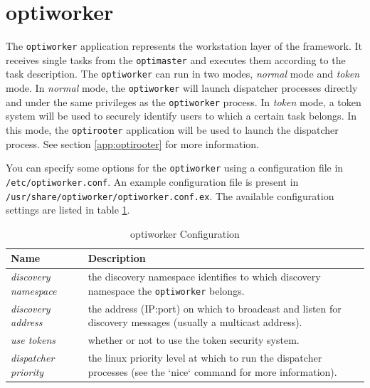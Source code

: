 \documentclass{report}
\begin{document}
\section{optiworker}\label{app:optiworker}
The \verb!optiworker! application represents the workstation layer of the framework. It
receives single tasks from the \verb!optimaster! and executes them according to the
task description. The \verb!optiworker! can run in two modes, \textit{normal} mode
and \textit{token} mode. In \textit{normal} mode, the \verb!optiworker! will launch
dispatcher processes directly and under the same privileges as the \verb!optiworker!
process. In \textit{token} mode, a token system will be used to securely
identify users to which a certain task belongs. In this mode, the
\verb!optirooter! application will be used to launch the dispatcher process.
See section \ref{app:optirooter} for more information.

You can specify some
options for the \verb!optiworker! using a configuration file in \verb!/etc/optiworker.conf!.
An example configuration file is present in
\verb!/usr/share/optiworker/optiworker.conf.ex!. The available configuration
settings are listed in table \ref{tab:optiworker_configuration}.

\begin{table}[h!tb]\caption{optiworker Configuration}\label{tab:optiworker_configuration}\vspace{0.1in}
	\centering

	\begin{tabular}{p{4cm} p{10cm}}
		\toprule
		\textbf{Name} & \textbf{Description} \\
		\midrule
		\textit{discovery namespace} & the discovery namespace identifies
		                               to which discovery namespace the
		                               \verb!optiworker! belongs. \\
		\textit{discovery address} & the address (IP:port) on which to
		                             broadcast and listen for discovery
		                             messages (usually a multicast address). \\
		\textit{use tokens} & whether or not to use the token security system. \\
		\textit{dispatcher priority} & the linux priority level at which to
		                               run the dispatcher processes (see the
		                               `nice` command for more information). \\
		\bottomrule
	\end{tabular}
\end{table}
\end{document}
